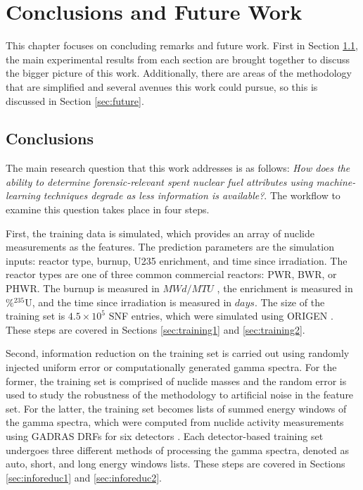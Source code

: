 \chapter{Conclusions and Future Work}
\label{ch:concl}

This chapter focuses on concluding remarks and future work.  First in Section
\ref{sec:concl}, the main experimental results from each section are brought
together to discuss the bigger picture of this work.  Additionally, there are
areas of the methodology that are simplified and several avenues this work
could pursue, so this is discussed in Section \ref{sec:future}.

\section{Conclusions}
\label{sec:concl}


The main research question that this work addresses is as follows: \textit{How
does the ability to determine forensic-relevant spent nuclear fuel attributes
using machine-learning techniques degrade as less information is available?}. 
The workflow to examine this question takes place in four steps.  

First, the training data is simulated, which provides an array of nuclide
measurements as the features. The prediction parameters are the simulation
inputs: reactor type, burnup, \gls{U235} enrichment, and time since
irradiation.  The reactor types are one of three common commercial reactors:
\gls{PWR}, \gls{BWR}, or \gls{PHWR}.  The burnup is measured in $MWd/MTU$ , the
enrichment is measured in $\%{}^{235}\text{U}$, and the time since irradiation
is measured in $days$. The size of the training set is $4.5 \times 10^5$
\gls{SNF} entries, which were simulated using \gls{ORIGEN} \cite{scale, origen,
origenarp}.  These steps are covered in Sections \ref{sec:training1} and
\ref{sec:training2}.

Second, information reduction on the training set is carried out using randomly
injected uniform error or computationally generated gamma spectra. For the
former, the training set is comprised of nuclide masses and the random error is
used to study the robustness of the methodology to artificial noise in the
feature set.  For the latter, the training set becomes lists of summed energy
windows of the gamma spectra, which were computed from nuclide activity
measurements using \gls{GADRAS} \gls{DRF}s for six detectors \cite{gadras}.
Each detector-based training set undergoes three different methods of
processing the gamma spectra, denoted as auto, short, and long energy windows
lists.  These steps are covered in Sections \ref{sec:inforeduc1} and
\ref{sec:inforeduc2}.

